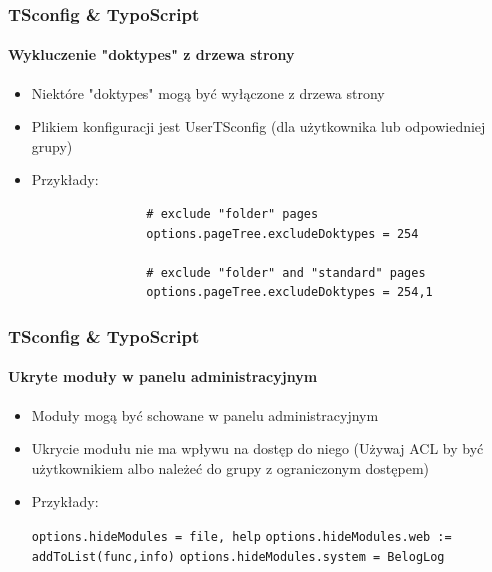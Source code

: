 
\begin{frame}[fragile]
	\frametitle{TSconfig \& TypoScript}
	\framesubtitle{Wykluczenie "doktypes" z drzewa strony}

	\begin{itemize}

		\item Niektóre "doktypes" mogą być wyłączone z drzewa strony
		\item Plikiem konfiguracji jest UserTSconfig (dla użytkownika lub odpowiedniej grupy)
		\item Przykłady:

			\begin{lstlisting}
				# exclude "folder" pages
				options.pageTree.excludeDoktypes = 254

				# exclude "folder" and "standard" pages
				options.pageTree.excludeDoktypes = 254,1
			\end{lstlisting}

	\end{itemize}

\end{frame}


\begin{frame}[fragile]
	\frametitle{TSconfig \& TypoScript}
	\framesubtitle{Ukryte moduły w panelu administracyjnym}

	\begin{itemize}

		\item Moduły mogą być schowane w panelu administracyjnym
		\item Ukrycie modułu nie ma wpływu na dostęp do niego\newline
			(Używaj ACL by być użytkownikiem albo należeć do grupy z ograniczonym dostępem)
		\item Przykłady:

			\lstinline!options.hideModules = file, help!
			\lstinline!options.hideModules.web := addToList(func,info)!
			\lstinline!options.hideModules.system = BelogLog!

	\end{itemize}

\end{frame}


